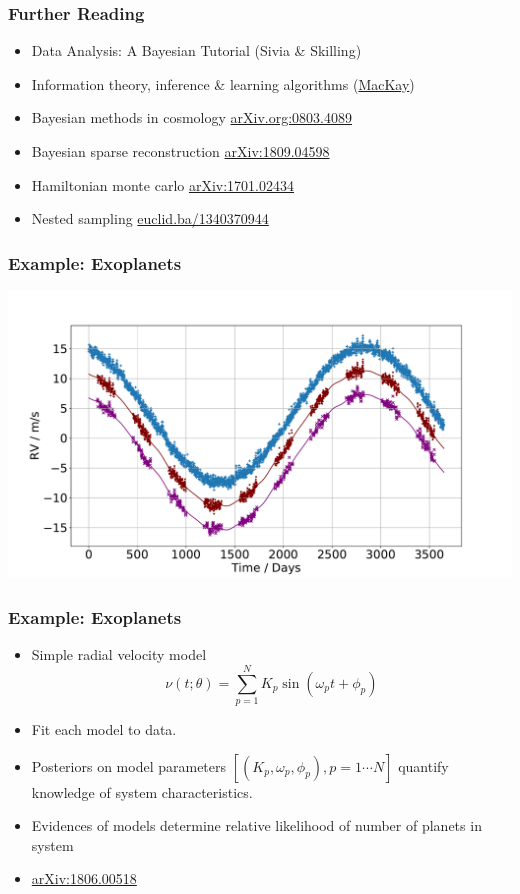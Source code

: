 \documentclass[%
]{beamer}
\begin{document}
\begin{frame}
    \frametitle{Further Reading}
    \begin{itemize}
        \item Data Analysis: A Bayesian Tutorial (Sivia \& Skilling)
        \item Information theory, inference \& learning algorithms (\href{http://www.inference.org.uk/itila/book.html}{MacKay})
        \item Bayesian methods in cosmology \href{https://arxiv.org/abs/0803.4089}{arXiv.org:0803.4089}
        \item Bayesian sparse reconstruction \href{https://arxiv.org/abs/1809.04598}{arXiv:1809.04598}
        \item Hamiltonian monte carlo \href{https://arxiv.org/abs/1701.02434}{arXiv:1701.02434}
        \item Nested sampling \href{https://projecteuclid.org/euclid.ba/1340370944}{euclid.ba/1340370944}
    \end{itemize}
\end{frame}

\begin{frame}
  \frametitle{Example: Exoplanets}
  \includegraphics[width=\textwidth]{figures/rv_full.pdf}
\end{frame}
\begin{frame}
  \frametitle{Example: Exoplanets}
  \begin{itemize}
      \item Simple radial velocity model
          \begin{equation}
              \nu(t;\theta) = \sum_{p=1}^N K_p \sin(\omega_p t + \phi_p)\nonumber
          \end{equation}
      \item Fit each model to data.
      \item Posteriors on model parameters $[(K_p,\omega_p,\phi_p),p=1\cdots N]$ quantify knowledge of system characteristics.
      \item Evidences of models determine relative likelihood of number of planets in system
      \item \href{https://arxiv.org/abs/1806.00518}{arXiv:1806.00518}
  \end{itemize}
\end{frame}
\end{document}
